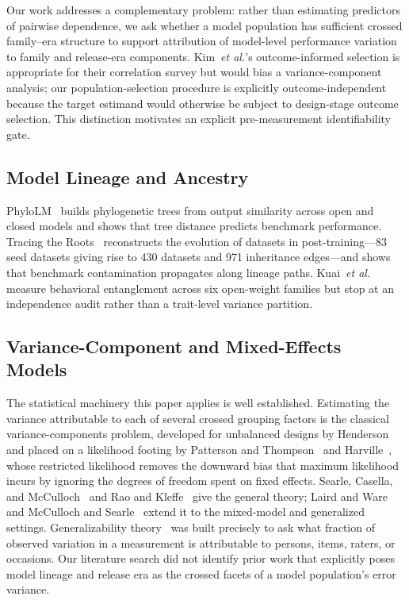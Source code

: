 \documentclass{ieeeaccess}
\theoremstyle{definition}
\theoremstyle{plain}
\begin{document}
Our work addresses a complementary problem: rather than estimating predictors of pairwise dependence, we ask whether a model population has sufficient crossed family--era structure to support attribution of model-level performance variation to family and release-era components. Kim~\textit{et al.}'s outcome-informed selection is appropriate for their correlation survey but would bias a variance-component analysis; our population-selection procedure is explicitly outcome-independent because the target estimand would otherwise be subject to design-stage outcome selection. This distinction motivates an explicit pre-measurement identifiability gate.

\subsection{Model Lineage and Ancestry}
PhyloLM~\cite{phylolm2024} builds phylogenetic trees from output similarity across open and closed models and shows that tree distance predicts benchmark performance. Tracing the Roots~\cite{li2026roots} reconstructs the evolution of datasets in post-training---83 seed datasets giving rise to 430 datasets and 971 inheritance edges---and shows that benchmark contamination propagates along lineage paths. Kuai~\textit{et al.}~\cite{kuai2026} measure behavioral entanglement across six open-weight families but stop at an independence audit rather than a trait-level variance partition.

\subsection{Variance-Component and Mixed-Effects Models}
The statistical machinery this paper applies is well established. Estimating the variance attributable to each of several crossed grouping factors is the classical variance-components problem, developed for unbalanced designs by Henderson~\cite{henderson1975} and placed on a likelihood footing by Patterson and Thompson~\cite{patterson1971} and Harville~\cite{harville1977}, whose restricted likelihood removes the downward bias that maximum likelihood incurs by ignoring the degrees of freedom spent on fixed effects. Searle, Casella, and McCulloch~\cite{searle1992} and Rao and Kleffe~\cite{rao1988} give the general theory; Laird and Ware~\cite{laird1982} and McCulloch and Searle~\cite{mcculloch2001} extend it to the mixed-model and generalized settings. Generalizability theory~\cite{brennan2001,cronbach1972} was built precisely to ask what fraction of observed variation in a measurement is attributable to persons, items, raters, or occasions. Our literature search did not identify prior work that explicitly poses model lineage and release era as the crossed facets of a model population's error variance.
\end{document}
